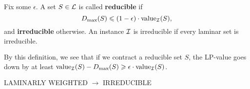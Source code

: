 \documentclass[./main.tex]{subfiles}
\begin{document}
	\begin{definition}
		Fix some $\epsilon$. A set $S\in \mathcal{L}$ is called \textbf{reducible} if
		\[
			D_{\max}(S) \leqslant (1 - \epsilon)\cdot \textup{value}_{\mathcal{I}}(S),
		\]
		and \textbf{irreducible} otherwise.
		An instance $\mathcal{I}$ is irreducible if every laminar set is irreducible.
	\end{definition}

	By this definition, we see that if we contract a reducible set $S$, the LP-value goes down by at least $\textup{value}_{\mathcal{I}}(S) - D_{\max}(S) \geqslant \epsilon\cdot \textup{value}_{\mathcal{I}}(S)$.\\

	\begin{algorithm}[h]\label{alg:1}
		\caption{LAMINARLY WEIGHTED $\rightarrow$ IRREDUCIBLE}
	\end{algorithm}
\end{document}
